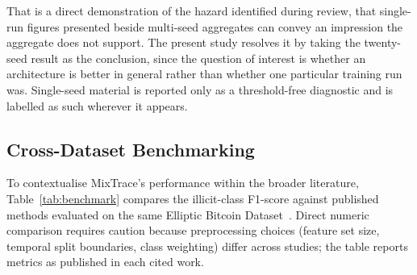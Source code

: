 \documentclass[12pt,a4paper]{article}
\begin{document}
That is a direct demonstration of the hazard identified during
review, that single-run figures presented beside multi-seed
aggregates can convey an impression the aggregate does not
support. The present study resolves it by taking the twenty-seed
result as the conclusion, since the question of interest is
whether an architecture is better in general rather than whether
one particular training run was. Single-seed material is reported
only as a threshold-free diagnostic and is labelled as such
wherever it appears.


\subsection{Cross-Dataset Benchmarking}
\label{sec:crossdataset}

To contextualise MixTrace's performance within the broader
literature, Table~\ref{tab:benchmark} compares the illicit-class
F1-score against published methods evaluated on the same Elliptic
Bitcoin Dataset~\citep{weber2019}.
Direct numeric comparison requires caution because preprocessing
choices (feature set size, temporal split boundaries, class
weighting) differ across studies; the table reports metrics as
published in each cited work.
\end{document}
